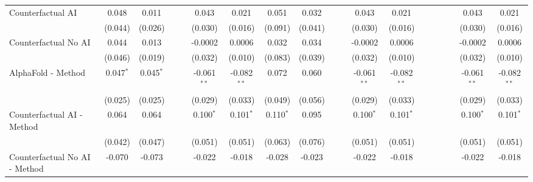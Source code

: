 \begin{tabular}{lcccccccccccccccccc}
   Counterfactual AI                                          & 0.048         & 0.011         &     &     & 0.043          & 0.021         & 0.051       & 0.032   &     &      & 0.043          & 0.021         &      &      &      &      & 0.043          & 0.021\\   
                                                              & (0.044)       & (0.026)       &     &     & (0.030)        & (0.016)       & (0.091)     & (0.041) &     &      & (0.030)        & (0.016)       &      &      &      &      & (0.030)        & (0.016)\\   
   Counterfactual No AI                                       & 0.044         & 0.013         &     &     & -0.0002        & 0.0006        & 0.032       & 0.034   &     &      & -0.0002        & 0.0006        &      &      &      &      & -0.0002        & 0.0006\\   
                                                              & (0.046)       & (0.019)       &     &     & (0.032)        & (0.010)       & (0.083)     & (0.039) &     &      & (0.032)        & (0.010)       &      &      &      &      & (0.032)        & (0.010)\\   
   AlphaFold - Method                                         & 0.047$^{*}$   & 0.045$^{*}$   &     &     & -0.061$^{**}$  & -0.082$^{**}$ & 0.072       & 0.060   &     &      & -0.061$^{**}$  & -0.082$^{**}$ &      &      &      &      & -0.061$^{**}$  & -0.082$^{**}$\\   
                                                              & (0.025)       & (0.025)       &     &     & (0.029)        & (0.033)       & (0.049)     & (0.056) &     &      & (0.029)        & (0.033)       &      &      &      &      & (0.029)        & (0.033)\\   
   Counterfactual AI - Method                                 & 0.064         & 0.064         &     &     & 0.100$^{*}$    & 0.101$^{*}$   & 0.110$^{*}$ & 0.095   &     &      & 0.100$^{*}$    & 0.101$^{*}$   &      &      &      &      & 0.100$^{*}$    & 0.101$^{*}$\\   
                                                              & (0.042)       & (0.047)       &     &     & (0.051)        & (0.051)       & (0.063)     & (0.076) &     &      & (0.051)        & (0.051)       &      &      &      &      & (0.051)        & (0.051)\\   
   Counterfactual No AI - Method                              & -0.070        & -0.073        &     &     & -0.022         & -0.018        & -0.028      & -0.023  &     &      & -0.022         & -0.018        &      &      &      &      & -0.022         & -0.018\\   

\end{tabular}
